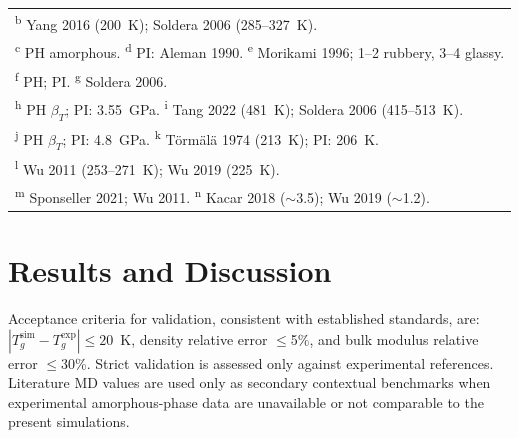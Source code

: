 \documentclass[journal=acsami,manuscript=article]{achemso}
\begin{document}
\begin{table}[ht]
\begin{tabular}{ll cc cc cc}
\multicolumn{8}{l}{\scriptsize \textsuperscript{b} Yang 2016\cite{yang2016pe} (200~K); Soldera 2006\cite{soldera2006tg} (285--327~K).} \\
\multicolumn{8}{l}{\scriptsize \textsuperscript{c} PH amorphous.\cite{brandrup1999polymerhandbook} \textsuperscript{d} PI: Aleman 1990. \textsuperscript{e} Morikami 1996;\cite{morikami1996bulkmodulus} 1--2 rubbery, 3--4 glassy.} \\
\multicolumn{8}{l}{\scriptsize \textsuperscript{f} PH;\cite{brandrup1999polymerhandbook} PI.\cite{otsuka2011polyinfo} \textsuperscript{g} Soldera 2006\cite{soldera2006tg}.} \\
\multicolumn{8}{l}{\scriptsize \textsuperscript{h} PH $\beta_T$;\cite{brandrup1999polymerhandbook} PI: 3.55~GPa. \textsuperscript{i} Tang 2022\cite{tang2022pmma} (481~K); Soldera 2006\cite{soldera2006tg} (415--513~K).} \\
\multicolumn{8}{l}{\scriptsize \textsuperscript{j} PH $\beta_T$;\cite{brandrup1999polymerhandbook} PI: 4.8~GPa. \textsuperscript{k} T\"{o}rm\"{a}l\"{a} 1974\cite{tormala1974pegtg} (213~K); PI: 206~K.} \\
\multicolumn{8}{l}{\scriptsize \textsuperscript{l} Wu 2011\cite{wu2011peo} (253--271~K); Wu 2019\cite{wu2019peo} (225~K).} \\
\multicolumn{8}{l}{\scriptsize \textsuperscript{m} Sponseller 2021;\cite{sponseller2021peg} Wu 2011.\cite{wu2011peo} \textsuperscript{n} Kacar 2018\cite{kacar2018peg} ($\sim$3.5); Wu 2019\cite{wu2019peo} ($\sim$1.2).} \\
\end{tabular}
\end{table}


\section{Results and Discussion}

Acceptance criteria for validation, consistent with established standards,\cite{afzal2021highthroughput, Harish2024, maicas2021epoxyMD} are: $|T_g^{\text{sim}} - T_g^{\text{exp}}| \leq 20$~K, density relative error $\leq$5\%, and bulk modulus relative error $\leq$30\%.
Strict validation is assessed only against experimental references. Literature MD values are used only as secondary contextual benchmarks when experimental amorphous-phase data are unavailable or not comparable to the present simulations.
\end{document}
